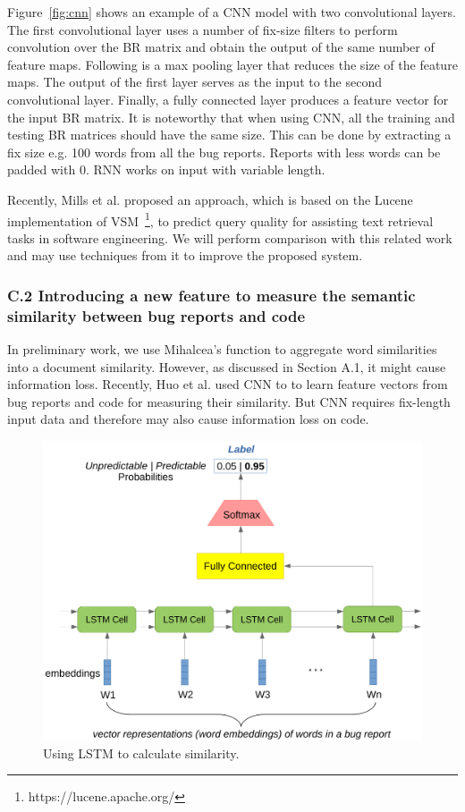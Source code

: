 Figure~\ref{fig:cnn} shows an example of a CNN model \cite{LeCun:1989:BAH:1351079.1351090} with two convolutional layers. The first convolutional layer uses a number of fix-size filters to perform convolution over the BR matrix and obtain the output of the same number of feature maps. Following is a max pooling layer that reduces the size of the feature maps. The output of the first layer serves as the input to the second convolutional layer. Finally, a fully connected layer produces a feature vector for the input BR matrix. It is noteworthy that when using CNN, all the training and testing BR matrices should have the same size. This can be done by extracting a fix size e.g. 100 words from all the bug reports. Reports with less words can be padded with 0. RNN works on input with variable length.

Recently, Mills et al. \cite{Mills:2017:PQQ:3092955.3078841} proposed an approach, which is based on the Lucene implementation of VSM~\footnote{https://lucene.apache.org/}, to predict query quality for assisting text retrieval tasks in software engineering. We will perform comparison with this related work and may use techniques from it to improve the proposed system.

\subsubsection{C.2 Introducing a new feature to measure the semantic similarity between bug reports and code}
In preliminary work, we use Mihalcea's function to aggregate word similarities into a document similarity. However, as discussed in Section A.1, it might cause information loss. Recently, Huo et al. \cite{Huo:2016:LUF:3060832.3060845} used CNN to to learn feature vectors from bug reports and code for measuring their similarity. But CNN requires fix-length input data and therefore may also cause information loss on code.

\begin{figure}[!h]
\centering
\includegraphics[width=\columnwidth]{figures/lstm.pdf}
\caption{Using LSTM to calculate similarity.}
\label{fig:lstm}
\end{figure}

